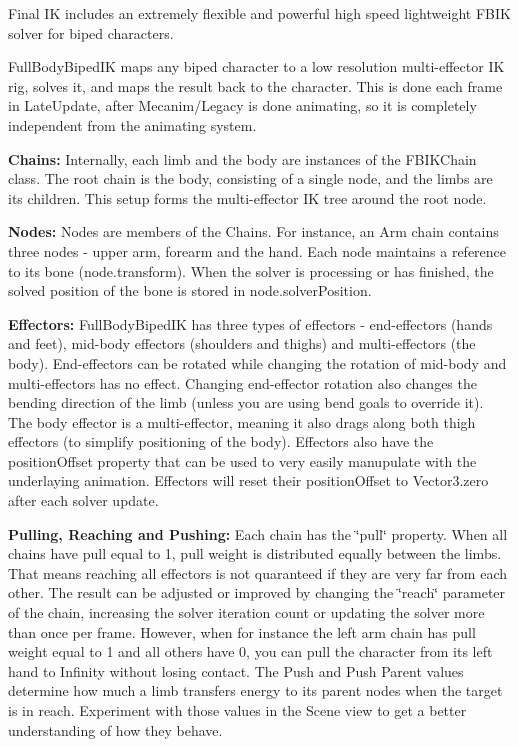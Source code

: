 Final IK includes an extremely flexible and powerful high speed lightweight F\+B\+IK solver for biped characters.

Full\+Body\+Biped\+IK maps any biped character to a low resolution multi-\/effector IK rig, solves it, and maps the result back to the character. This is done each frame in Late\+Update, after Mecanim/\+Legacy is done animating, so it is completely independent from the animating system.

{\bfseries Chains\+:} Internally, each limb and the body are instances of the F\+B\+I\+K\+Chain class. The root chain is the body, consisting of a single node, and the limbs are it\textquotesingle{}s children. This setup forms the multi-\/effector IK tree around the root node.

{\bfseries Nodes\+:} Nodes are members of the Chains. For instance, an Arm chain contains three nodes -\/ upper arm, forearm and the hand. Each node maintains a reference to it\textquotesingle{}s bone (node.\+transform). When the solver is processing or has finished, the solved position of the bone is stored in node.\+solver\+Position.

{\bfseries Effectors\+:} Full\+Body\+Biped\+IK has three types of effectors -\/ end-\/effectors (hands and feet), mid-\/body effectors (shoulders and thighs) and multi-\/effectors (the body). End-\/effectors can be rotated while changing the rotation of mid-\/body and multi-\/effectors has no effect. Changing end-\/effector rotation also changes the bending direction of the limb (unless you are using bend goals to override it). The body effector is a multi-\/effector, meaning it also drags along both thigh effectors (to simplify positioning of the body). Effectors also have the position\+Offset property that can be used to very easily manupulate with the underlaying animation. Effectors will reset their position\+Offset to Vector3.\+zero after each solver update.

{\bfseries Pulling, Reaching and Pushing\+:} Each chain has the \char`\"{}pull\char`\"{} property. When all chains have pull equal to 1, pull weight is distributed equally between the limbs. That means reaching all effectors is not quaranteed if they are very far from each other. The result can be adjusted or improved by changing the \char`\"{}reach\char`\"{} parameter of the chain, increasing the solver iteration count or updating the solver more than once per frame. However, when for instance the left arm chain has pull weight equal to 1 and all others have 0, you can pull the character from it\textquotesingle{}s left hand to Infinity without losing contact. The Push and Push Parent values determine how much a limb transfers energy to it\textquotesingle{}s parent nodes when the target is in reach. Experiment with those values in the Scene view to get a better understanding of how they behave.

